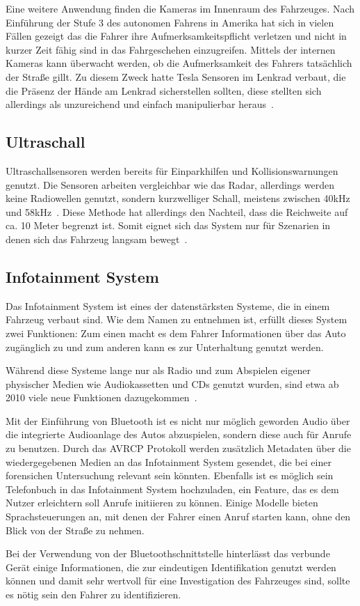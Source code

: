 \documentclass[conference,compsoc,final,a4paper]{IEEEtran}
\begin{document}
Eine weitere Anwendung finden die Kameras im Innenraum des Fahrzeuges.
Nach Einführung der Stufe 3 des autonomen Fahrens in Amerika hat sich in vielen Fällen gezeigt das die Fahrer
ihre Aufmerksamkeitspflicht verletzen und nicht in kurzer Zeit fähig sind in das Fahrgeschehen einzugreifen.
Mittels der internen Kameras kann überwacht werden, ob die Aufmerksamkeit des Fahrers tatsächlich der Straße gillt.
Zu diesem Zweck hatte Tesla Sensoren im Lenkrad verbaut, die die Präsenz der Hände am Lenkrad sicherstellen sollten,
diese stellten sich allerdings als unzureichend und einfach manipulierbar heraus~\cite{Trudell2021}.

\subsection{Ultraschall}

Ultraschallsensoren werden bereits für Einparkhilfen und Kollisionswarnungen genutzt.
Die Sensoren arbeiten vergleichbar wie das Radar, allerdings werden keine Radiowellen genutzt,
sondern kurzwelliger Schall, meistens zwischen 40kHz und 58kHz~\cite{Zhaohua2020}.
Diese Methode hat allerdings den Nachteil, dass die Reichweite auf ca. 10 Meter begrenzt ist. Somit eignet sich das System nur
für Szenarien in denen sich das Fahrzeug langsam bewegt~\cite{Petit2022}.

\subsection{Infotainment System}

Das Infotainment System ist eines der datenstärksten Systeme, die in einem Fahrzeug verbaut sind.
Wie dem Namen zu entnehmen ist, erfüllt dieses System zwei Funktionen:
Zum einen macht es dem Fahrer Informationen über das Auto zugänglich zu und zum anderen kann es zur Unterhaltung genutzt werden.

Während diese Systeme lange nur als Radio und zum Abspielen eigener physischer Medien wie Audiokassetten und CDs genutzt wurden,
sind etwa ab 2010 viele neue Funktionen dazugekommen~\cite{Rossi2021}.\par

Mit der Einführung von Bluetooth ist es nicht nur möglich geworden Audio über die integrierte Audioanlage des Autos abzuspielen,
sondern diese auch für Anrufe zu benutzen. Durch das \ac{AVRCP} Protokoll werden zusätzlich Metadaten über die wiedergegebenen Medien
an das Infotainment System gesendet, die bei einer forensichen Untersuchung relevant sein könnten.
Ebenfalls ist es möglich sein Telefonbuch in das Infotainment System hochzuladen, ein Feature, das es dem Nutzer erleichtern soll
Anrufe initiieren zu können. Einige Modelle bieten Sprachsteuerungen an, mit denen der Fahrer einen Anruf starten kann, ohne den Blick von
der Straße zu nehmen.\par
Bei der Verwendung von der Bluetoothschnittstelle hinterlässt das verbunde Gerät einige Informationen, die zur eindeutigen Identifikation
genutzt werden können und damit sehr wertvoll für eine Investigation des Fahrzeuges sind, sollte es nötig sein den Fahrer zu identifizieren.
\end{document}
